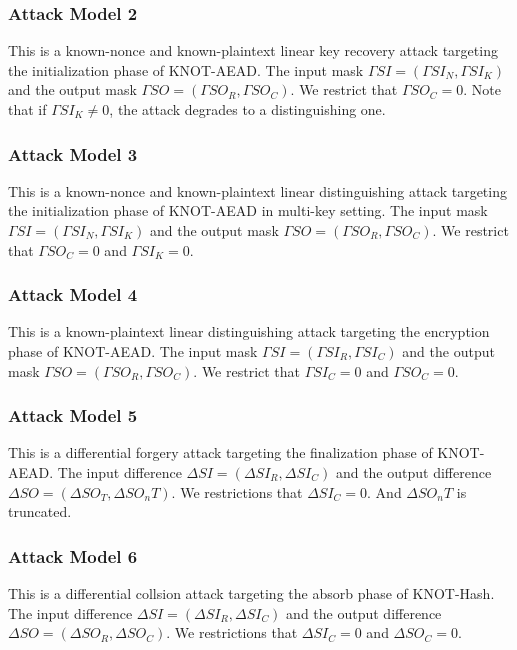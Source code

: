 \subsubsection{Attack Model 2}
This is a known-nonce and known-plaintext linear key recovery attack targeting the initialization phase of KNOT-AEAD. The input mask $\Gamma SI=(\Gamma SI_N,\Gamma SI_K)$ and the output mask $\Gamma SO=(\Gamma SO_R,\Gamma SO_C)$. We restrict that $\Gamma SO_C=0$. Note that if $\Gamma SI_K\neq 0$, the attack degrades to a distinguishing one. 

\subsubsection{Attack Model 3}
This is a known-nonce and known-plaintext linear distinguishing attack targeting the initialization phase of KNOT-AEAD in multi-key setting. The input mask $\Gamma SI=(\Gamma SI_N,\Gamma SI_K)$ and the output mask $\Gamma SO=(\Gamma SO_R,\Gamma SO_C)$. We restrict that $\Gamma SO_C=0$ and $\Gamma SI_K=0$.

\subsubsection{Attack Model 4}
This is a known-plaintext linear distinguishing attack targeting the encryption phase of KNOT-AEAD. The input mask $\Gamma SI=(\Gamma SI_R,\Gamma SI_C)$ and the output mask $\Gamma SO=(\Gamma SO_R,\Gamma SO_C)$. We restrict that $\Gamma SI_C=0$ and $\Gamma SO_C=0$. 

\subsubsection{Attack Model 5}
This is a differential forgery attack targeting the finalization phase of KNOT-AEAD. The input difference $\Delta SI=(\Delta SI_R,\Delta SI_C)$ and the output difference $\Delta SO=(\Delta SO_T,\Delta SO_nT)$. We restrictions that $\Delta SI_C=0$. And $\Delta SO_nT$ is truncated. 

\subsubsection{Attack Model 6}
This is a differential collsion attack targeting the absorb phase of KNOT-Hash. The input difference $\Delta SI=(\Delta SI_R,\Delta SI_C)$ and the output difference $\Delta SO=(\Delta SO_R,\Delta SO_C)$. We restrictions that $\Delta SI_C=0$ and $\Delta SO_C=0$. 

